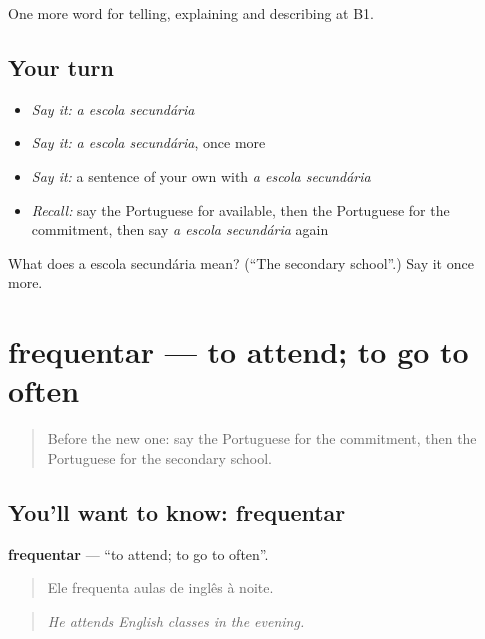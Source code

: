 \begin{grammarlens}[title={What you've built}]
One more word for telling, explaining and describing at B1.
\end{grammarlens}

\subsection*{Your turn}
\begin{itemize}
\raggedright
  \item \emph{Say it:} \emph{a escola secundária}
  \item \emph{Say it:} \emph{a escola secundária}, once more
  \item \emph{Say it:} a sentence of your own with \emph{a escola secundária}
  \item \emph{Recall:} say the Portuguese for available, then the Portuguese for the commitment, then say \emph{a escola secundária} again
\end{itemize}

\begin{tcolorbox}[breakable,colback=teal!4,colframe=teal!35!black,title={Before you move on}]
What does a escola secundária mean? (\textquotedblleft{}The secondary school\textquotedblright{}.) Say it once more.
\end{tcolorbox}
\section[frequentar]{frequentar — to attend; to go to often}

\label{lesson:PT-C375-frequentar}



\begin{quote}
Before the new one: say the Portuguese for the commitment, then the Portuguese for the secondary school.
\end{quote}

\subsection*{You'll want to know: frequentar}
\textbf{frequentar} — \textquotedblleft{}to attend; to go to often\textquotedblright{}.

\begin{quote}
Ele frequenta aulas de inglês à noite.
\end{quote}

\begin{quote}
\emph{He attends English classes in the evening.}
\end{quote}

